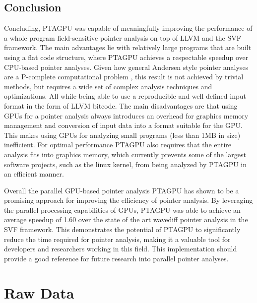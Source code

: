 \section{Conclusion}
Concluding, PTAGPU was capable of meaningfully improving the performance of a whole program field-sensitive pointer analysis on top of LLVM and the SVF framework.
The main advantages lie with relatively large programs that are built using a flat code structure, where PTAGPU achieves a respectable speedup over CPU-based pointer analyses.
Given how general Andersen style pointer analyses are a P-complete computational problem \cite{mathiasen2021fine}, this result is not achieved by trivial methods, but requires a wide set of complex analysis techniques and optimizations. All while being able to use a reproducible and well defined input format in the form of LLVM bitcode.
The main disadvantages are that using GPUs for a pointer analysis always introduces an overhead for graphics memory management and conversion of input data into a format suitable for the GPU.
This makes using GPUs for analyzing small programs (less than 1MB in size) inefficient.
For optimal performance PTAGPU also requires that the entire analysis fits into graphics memory, which currently prevents some of the largest software projects, such as the linux kernel, from being analyzed by PTAGPU in an efficient manner.

Overall the parallel GPU-based pointer analysis PTAGPU has shown to be a promising approach for improving the efficiency of pointer analysis. By leveraging the parallel processing capabilities of GPUs, PTAGPU was able to achieve an average speedup of 1.60 over the state of the art wavediff pointer analysis in the SVF framework. This demonstrates the potential of PTAGPU to significantly reduce the time required for pointer analysis, making it a valuable tool for developers and researchers working in this field.
This implementation should provide a good reference for future research into parallel pointer analyses.
\appendix

\chapter{Raw Data}

